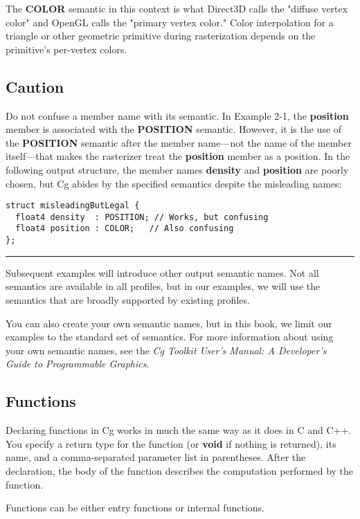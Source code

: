 \documentclass[../main.tex]{subfiles}
\begin{document}
The \textbf{COLOR} semantic in this context is what Direct3D calls the "diffuse vertex color" and OpenGL calls the "primary vertex color." Color interpolation for a triangle or other geometric primitive during rasterization depends on the primitive's per-vertex colors.

\subsection*{Caution}

Do not confuse a member name with its semantic. In Example 2-1, the \textbf{position} member is associated with the \textbf{POSITION} semantic. However, it is the use of the \textbf{POSITION} semantic after the member name—not the name of the member itself—that makes the rasterizer treat the \textbf{position} member as a position. In the following output structure, the member names \textbf{density} and \textbf{position} are poorly chosen, but Cg abides by the specified semantics despite the misleading names:

\FloatBarrier
\begin{lstlisting}
struct misleadingButLegal {
  float4 density  : POSITION; // Works, but confusing
  float4 position : COLOR;   // Also confusing
};
\end{lstlisting}
\FloatBarrier
\hrule

Subsequent examples will introduce other output semantic names. Not all semantics are available in all profiles, but in our examples, we will use the semantics that are broadly supported by existing profiles.

You can also create your own semantic names, but in this book, we limit our examples to the standard set of semantics. For more information about using your own semantic names, see the \textit{Cg Toolkit User's Manual: A Developer's Guide to Programmable Graphics}.

\subsection{Functions}

Declaring functions in Cg works in much the same way as it does in C and C++. You specify a return type for the function (or \textbf{void} if nothing is returned), its name, and a comma-separated parameter list in parentheses. After the declaration, the body of the function describes the computation performed by the function.

Functions can be either entry functions or internal functions.
\end{document}
